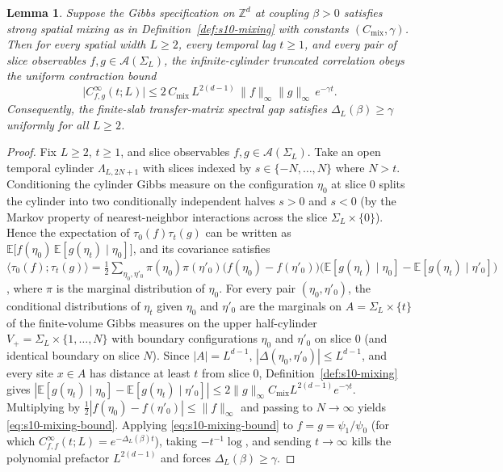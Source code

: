 \documentclass[11pt]{article}
\newtheorem{lemma}[theorem]{Lemma}
\theoremstyle{definition}
\begin{document}
\begin{lemma}
\label{lem:s10-dobrushin-bridge}
Suppose the Gibbs specification on $\mathbb{Z}^d$ at coupling $\beta > 0$ satisfies
strong spatial mixing as in Definition~\ref{def:s10-mixing} with constants
$(C_{\mathrm{mix}}, \gamma)$. Then for every spatial width $L \ge 2$, every temporal
lag $t \ge 1$, and every pair of slice observables $f, g \in \mathcal{A}(\Sigma_L)$,
the infinite-cylinder truncated correlation obeys the uniform contraction bound
\begin{equation}
\label{eq:s10-mixing-bound}
  \bigl|C_{f,g}^\infty(t; L)\bigr| \le 2 \, C_{\mathrm{mix}} \, L^{2(d-1)} \, \|f\|_\infty \|g\|_\infty \, e^{-\gamma t}.
\end{equation}
Consequently, the finite-slab transfer-matrix spectral gap satisfies
$\Delta_L(\beta) \ge \gamma$ uniformly for all $L \ge 2$.
\end{lemma}
\begin{proof}
Fix $L \ge 2$, $t \ge 1$, and slice observables $f, g \in \mathcal{A}(\Sigma_L)$.
Take an open temporal cylinder $\Lambda_{L, 2N+1}$ with slices indexed by $s \in
\{-N, \dots, N\}$ where $N > t$. Conditioning the cylinder Gibbs measure on the
configuration $\eta_0$ at slice $0$ splits the cylinder into two conditionally
independent halves $s > 0$ and $s < 0$ (by the Markov property of nearest-neighbor
interactions across the slice $\Sigma_L \times \{0\}$). Hence the expectation of
$\tau_0(f) \tau_t(g)$ can be written as $\mathbb{E}\bigl[f(\eta_0) \,
\mathbb{E}[g(\eta_t) \mid \eta_0]\bigr]$, and its covariance satisfies $\langle
\tau_0(f) ; \tau_t(g) \rangle = \frac{1}{2} \sum_{\eta_0, \eta'_0} \pi(\eta_0)
\pi(\eta'_0) \bigl(f(\eta_0) - f(\eta'_0)\bigr) \bigl(\mathbb{E}[g(\eta_t) \mid
\eta_0] - \mathbb{E}[g(\eta_t) \mid \eta'_0]\bigr)$, where $\pi$ is the marginal
distribution of $\eta_0$. For every pair $(\eta_0, \eta'_0)$, the conditional
distributions of $\eta_t$ given $\eta_0$ and $\eta'_0$ are the marginals on $A =
\Sigma_L \times \{t\}$ of the finite-volume Gibbs measures on the upper
half-cylinder $V_+ = \Sigma_L \times \{1, \dots, N\}$ with boundary configurations
$\eta_0$ and $\eta'_0$ on slice $0$ (and identical boundary on slice $N$). Since
$|A| = L^{d-1}$, $|\Delta(\eta_0, \eta'_0)| \le L^{d-1}$, and every site $x \in A$
has distance at least $t$ from slice $0$, Definition~\ref{def:s10-mixing} gives
$|\mathbb{E}[g(\eta_t) \mid \eta_0] - \mathbb{E}[g(\eta_t) \mid \eta'_0]| \le 2
\|g\|_\infty C_{\mathrm{mix}} L^{2(d-1)} e^{-\gamma t}$. Multiplying by $\frac{1}{2}
|f(\eta_0) - f(\eta'_0)| \le \|f\|_\infty$ and passing to $N \to \infty$ yields
\eqref{eq:s10-mixing-bound}. Applying \eqref{eq:s10-mixing-bound} to $f = g = \psi_1
/ \psi_0$ (for which $C_{f,f}^\infty(t; L) = e^{-\Delta_L(\beta) t}$), taking
$-t^{-1} \log$, and sending $t \to \infty$ kills the polynomial prefactor
$L^{2(d-1)}$ and forces $\Delta_L(\beta) \ge \gamma$.
\end{proof}
\end{document}
